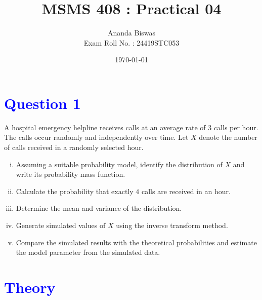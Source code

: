 \documentclass[11pt, a4paper]{article}\usepackage[]{graphicx}\usepackage[]{xcolor}
\title{MSMS 408 : Practical 04}
\author{Ananda Biswas \\[1em] Exam Roll No. : 24419STC053}
\date{\today}
\begin{document}
\maketitle


\section*{\faArrowAltCircleRight[regular] \textcolor{blue}{Question 1}}

\hspace{1cm} A hospital emergency helpline receives calls at an average rate of $3$ calls per hour. The calls occur randomly and independently over time. Let $X$ denote the number of calls received in a randomly selected hour. 

\begin{enumerate}[(i)]

\item Assuming a suitable probability model, identify the distribution of $X$ and write its probability mass function. 

\item Calculate the probability that exactly $4$ calls are received in an hour.

\item Determine the mean and variance of the distribution.

\item Generate simulated values of $X$ using the inverse transform method. 

\item Compare the simulated results with the theoretical probabilities and estimate the model parameter from the simulated data.

\end{enumerate}

\section*{\faArrowAltCircleRight[regular] \textcolor{blue}{Theory}}
\end{document}
